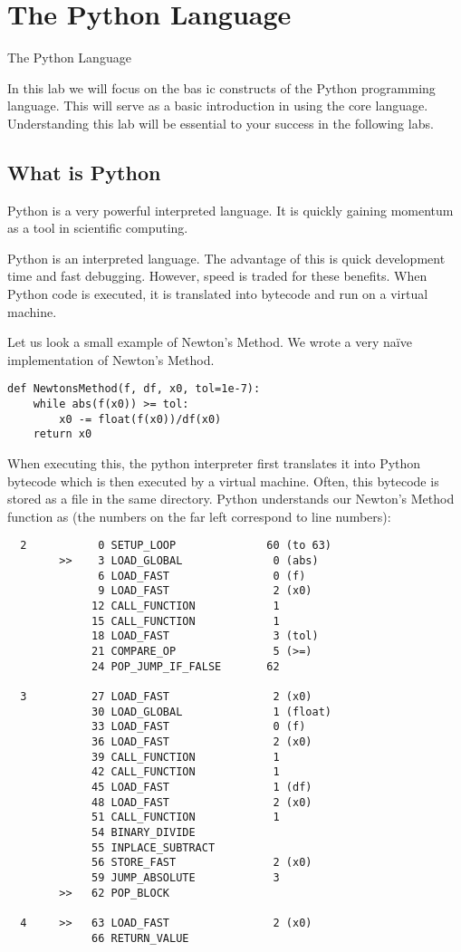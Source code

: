 \chapter{The Python Language}{The Python Language}
\label{Lab:PythonBasic}

In this lab we will focus on the bas ic constructs of the Python programming language.  This will serve as a basic introduction in using the core language.  Understanding this lab will be essential to your success in the following labs.

\section*{What is Python}
Python is a very powerful interpreted language.  It is quickly gaining momentum as a tool in scientific computing.

Python is an interpreted language.  The advantage of this is quick development time and fast debugging.  However, speed is traded for these benefits.  When Python code is executed, it is translated into bytecode and run on a virtual machine.

Let us look a small example of Newton's Method.  We wrote a very na\"ive implementation of Newton's Method.
\begin{lstlisting}[style=python]
def NewtonsMethod(f, df, x0, tol=1e-7):
    while abs(f(x0)) >= tol:
        x0 -= float(f(x0))/df(x0)
    return x0
\end{lstlisting}
When executing this, the python interpreter first translates it into Python bytecode which is then executed by a virtual machine.  Often, this bytecode is stored as a  file in the same directory.  Python understands our Newton's Method function as (the numbers on the far left correspond to line numbers):
\begin{verbatim}
  2           0 SETUP_LOOP              60 (to 63)
        >>    3 LOAD_GLOBAL              0 (abs)
              6 LOAD_FAST                0 (f)
              9 LOAD_FAST                2 (x0)
             12 CALL_FUNCTION            1
             15 CALL_FUNCTION            1
             18 LOAD_FAST                3 (tol)
             21 COMPARE_OP               5 (>=)
             24 POP_JUMP_IF_FALSE       62

  3          27 LOAD_FAST                2 (x0)
             30 LOAD_GLOBAL              1 (float)
             33 LOAD_FAST                0 (f)
             36 LOAD_FAST                2 (x0)
             39 CALL_FUNCTION            1
             42 CALL_FUNCTION            1
             45 LOAD_FAST                1 (df)
             48 LOAD_FAST                2 (x0)
             51 CALL_FUNCTION            1
             54 BINARY_DIVIDE       
             55 INPLACE_SUBTRACT    
             56 STORE_FAST               2 (x0)
             59 JUMP_ABSOLUTE            3
        >>   62 POP_BLOCK           

  4     >>   63 LOAD_FAST                2 (x0)
             66 RETURN_VALUE
\end{verbatim}

